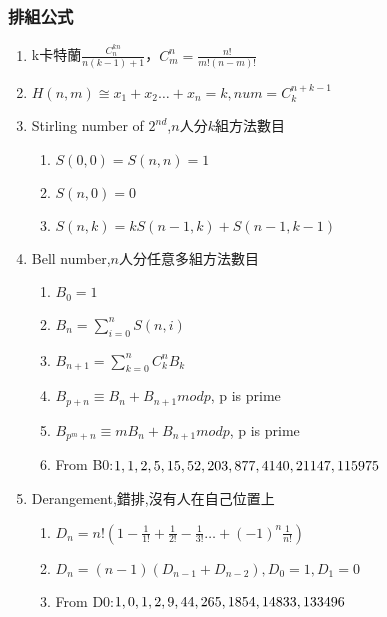 \subsubsection{排組公式}
\begin{enumerate}\itemsep = -3pt
\item k卡特蘭$\frac{C_{n}^{kn}}{n(k-1)+1}$，$C_{m}^{n}=\frac{n!}{m!(n-m)!}$
\item $H(n,m)\cong x_1+x_2\ldots +x_n=k, num=C_{k}^{n+k-1}$
\item Stirling number of $2^{nd}$,$n$人分$k$組方法數目
	\begin{enumerate}\itemsep = -2pt
		\item $S(0,0)=S(n,n)=1$
		\item $S(n,0)=0$
		\item $S(n,k)=kS(n-1,k)+S(n-1,k-1)$
	\end{enumerate}
\item Bell number,$n$人分任意多組方法數目
	\begin{enumerate}\itemsep = -2pt
		\item $B_0=1$
		\item $B_n=\sum_{i=0}^nS(n,i)$
		\item $B_{n+1}=\sum_{k=0}^{n} C_k^n B_k$
		\item $B_{p+n}\equiv B{_n}+B_{n+1} mod p$, p is prime
		\item $B_{p^m+n}\equiv mB{_n}+B_{n+1} mod p$, p is prime
		\item From B0:$1,1,2,5,15,52,\\203,877,4140,21147,115975$
	\end{enumerate}
\item Derangement,錯排,沒有人在自己位置上
	\begin{enumerate}\itemsep = -2pt
		\item $D_n=n!(1-\frac{1}{1!}+\frac{1}{2!}-\frac{1}{3!}\ldots +(-1)^n\frac{1}{n!})$
		\item $D_n=(n-1)(D_{n-1}+D_{n-2}),D_0=1,D_1=0$
		\item From D0:$1,0,1,2,9,44,\\265,1854,14833,133496$
	\end{enumerate}
\end{enumerate}

